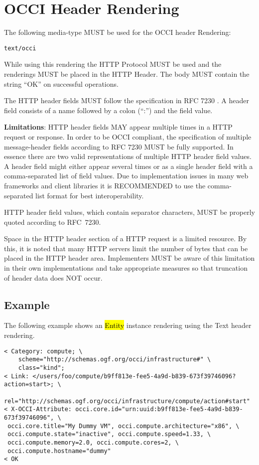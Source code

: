\documentclass[10pt,a4paper]{article}
\begin{document}
\section{OCCI Header Rendering}
\label{sec:header}
The following media-type MUST be used for the OCCI header Rendering:

{\tt text/occi}

While using this rendering the HTTP Protocol \cite{occi:http_protocol} MUST be used and the renderings
MUST be placed in the HTTP Header. The body MUST contain the string ``OK'' on successful operations.

The HTTP header fields MUST follow the specification in RFC 7230 \cite{rfc7230}. A header field consists of a name followed by a colon (``:'') and the field value.

\textbf{Limitations}: HTTP header fields MAY appear multiple times in a HTTP request or response. In order to be OCCI compliant, the specification of multiple message-header fields according to RFC 7230 MUST be fully supported. In essence there are two valid representations of multiple HTTP header field values. A header field might either appear several times or as a single header field with a comma-separated list of field values. Due to implementation issues in many web frameworks and client libraries it is RECOMMENDED to use the comma-separated list format for best interoperability.

HTTP header field values, which contain separator characters, MUST be properly quoted according to RFC~7230.

Space in the HTTP header section of a HTTP request is a limited resource. By this, it is noted that many HTTP servers limit the number of bytes that can be placed in the HTTP header area. Implementers MUST be aware of this limitation in their own implementations and take appropriate measures so that truncation of header data does NOT occur.

\subsection{Example}

The following example shows an \hl{Entity} instance rendering using the Text header rendering.

\begin{verbatim}
< Category: compute; \
    scheme="http://schemas.ogf.org/occi/infrastructure#" \
    class="kind";
< Link: </users/foo/compute/b9ff813e-fee5-4a9d-b839-673f39746096?action=start>; \
    rel="http://schemas.ogf.org/occi/infrastructure/compute/action#start"
< X-OCCI-Attribute: occi.core.id="urn:uuid:b9ff813e-fee5-4a9d-b839-673f39746096", \
 occi.core.title="My Dummy VM", occi.compute.architecture="x86", \
 occi.compute.state="inactive", occi.compute.speed=1.33, \
 occi.compute.memory=2.0, occi.compute.cores=2, \
 occi.compute.hostname="dummy"
< OK
\end{verbatim}
\end{document}
